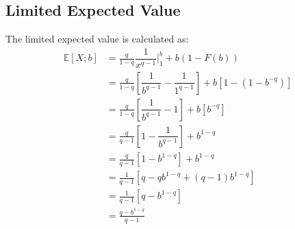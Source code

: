 \documentclass[]{article} %
\begin{document}
\subsection{Limited Expected Value}\label{ParetoLEV}
The limited expected value is calculated as:
\begin{align}
	\mathbb{E}[X;b] 	&= \frac{q}{1-q} \dfrac{1}{x^{q-1}} \Big|_{1}^{b} + b  (1-F(b))\nonumber\\
 	&=  \frac{q}{1-q} \left[ \dfrac{1}{b^{q-1}} - \dfrac{1}{1^{q-1}}\right]+  b  \left[1-(1-b^{-q})\right]\nonumber\\
 	&=  \frac{q}{1-q} \left[ \dfrac{1}{b^{q-1}} - 1\right]+  b  \left[b^{-q}\right]\nonumber\\
 	&=  \frac{q}{q-1} \left[1 - \dfrac{1}{b^{q-1}}\right]+ b^{1-q}\nonumber\\
 	&=  \frac{q}{q-1} \left[1 - b^{1-q}\right]+b^{1-q}\\ %
 	&=  \frac{1}{q-1} \left[q - qb^{1-q} + (q-1)b^{1-q}\right]\nonumber\\
 	&=  \frac{1}{q-1} \left[q - b^{1-q}\right]\nonumber\\
 	&=	\frac{q - b^{1-q}}{q-1}
 \end{align}
 


\end{document}
